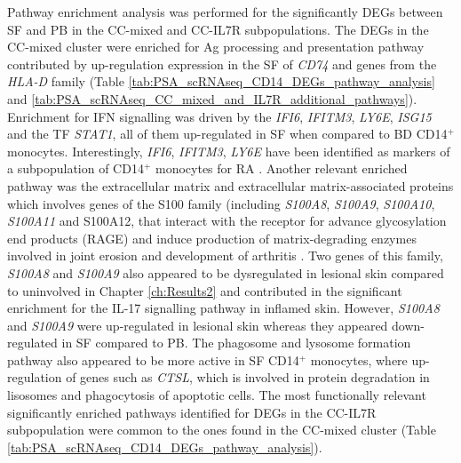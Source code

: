 Pathway enrichment analysis was performed for the significantly DEGs between SF and PB in the CC-mixed and CC-IL7R subpopulations. The DEGs in the CC-mixed cluster were enriched for Ag processing and presentation pathway contributed by up-regulation expression in the SF of \textit{CD74} and genes from the \textit{HLA-D} family \parencite{Lamb1992} (Table \ref{tab:PSA_scRNAseq_CD14_DEGs_pathway_analysis} and \ref{tab:PSA_scRNAseq_CC_mixed_and_IL7R_additional_pathways}). Enrichment for IFN signalling was driven by the \textit{IFI6}, \textit{IFITM3}, \textit{LY6E}, \textit{ISG15} and the TF \textit{STAT1}, all of them up-regulated in SF when compared to BD CD14$^+$ monocytes. Interestingly, \textit{IFI6}, \textit{IFITM3}, \textit{LY6E} have been identified as markers of a subpopulation of CD14$^+$ monocytes for RA \parencite{Zhang2018}. Another relevant enriched pathway was the extracellular matrix and extracellular matrix-associated proteins which involves genes of the S100 family (including \textit{S100A8}, \textit{S100A9}, \textit{S100A10}, \textit{S100A11} and S100A12, that interact with the receptor for advance glycosylation end products (RAGE) and induce production of matrix-degrading enzymes involved in joint erosion and development of arthritis \parencite{Raghunatha2012}. Two genes of this family, \textit{S100A8} and \textit{S100A9} also appeared to be dysregulated in lesional skin compared to uninvolved in Chapter \ref{ch:Results2} and contributed in the significant enrichment for the IL-17 signalling pathway in inflamed skin. However, \textit{S100A8} and \textit{S100A9} were up-regulated in lesional skin whereas they appeared down-regulated in SF compared to PB. The phagosome and lysosome formation pathway also appeared to be more active in SF CD14$^+$ monocytes, where up-regulation of genes such as \textit{CTSL}, which is involved in protein degradation in lisosomes and phagocytosis of apoptotic cells. %
The most functionally relevant significantly enriched pathways identified for DEGs in the CC-IL7R subpopulation were common to the ones found in the CC-mixed cluster (Table \ref{tab:PSA_scRNAseq_CD14_DEGs_pathway_analysis}).

